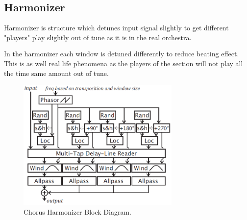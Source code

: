 \subsection{Harmonizer}

Harmonizer is structure which detunes input signal slightly to get different "players" play
slightly out of tune as it is in the real orchestra. 

In the harmonizer each window is detuned differently to reduce beating effect. This is
as well real life phenomena as the players of the section will not play all the time same amount
out of tune.  
 
\begin{figure}[ht]
\centering
\includegraphics[width = 8cm]{harmonizer.png}
\caption{Chorus Harmonizer Block Diagram. \cite{dudas}}
\label{harm_block}
\end{figure}
